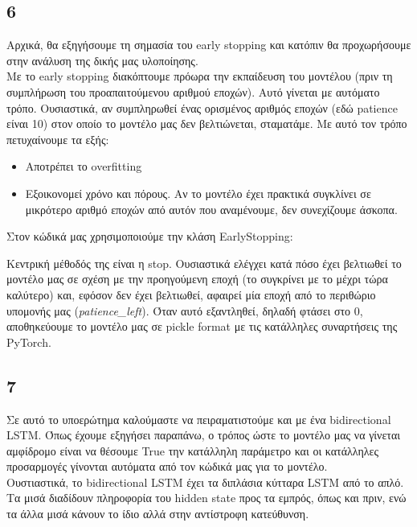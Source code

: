 \subsection*{6}
Αρχικά, θα εξηγήσουμε τη σημασία του early stopping και κατόπιν θα προχωρήσουμε στην ανάλυση της δικής μας υλοποίησης. \\

\noindent Με το early stopping διακόπτουμε πρόωρα την εκπαίδευση του μοντέλου (πριν τη συμπλήρωση του προαπαιτούμενου αριθμού εποχών). Αυτό γίνεται με αυτόματο τρόπο. Ουσιαστικά, αν συμπληρωθεί ένας ορισμένος αριθμός εποχών (εδώ patience είναι 10) στον οποίο το μοντέλο μας δεν βελτιώνεται, σταματάμε. Με αυτό τον τρόπο πετυχαίνουμε τα εξής:

\begin{itemize}
	\item Αποτρέπει το overfitting 
	
	\item  Εξοικονομεί χρόνο και πόρους. Αν το μοντέλο έχει πρακτικά συγκλίνει σε μικρότερο αριθμό εποχών από αυτόν που αναμένουμε, δεν συνεχίζουμε άσκοπα.
\end{itemize}

\noindent Στον κώδικά μας χρησιμοποιούμε την κλάση EarlyStopping:



\noindent Κεντρική μέθοδός της είναι η stop. Ουσιαστικά ελέγχει κατά πόσο έχει βελτιωθεί το μοντέλο μας σε σχέση με την προηγούμενη εποχή (το συγκρίνει με το μέχρι τώρα καλύτερο) και, εφόσον δεν έχει βελτιωθεί, αφαιρεί μία εποχή από το περιθώριο υπομονής μας (\textit{patience\_left}). Όταν αυτό εξαντληθεί, δηλαδή φτάσει στο 0, αποθηκεύουμε το μοντέλο μας σε pickle format με τις κατάλληλες συναρτήσεις της PyTorch.

\subsection*{7}
Σε αυτό το υποερώτημα καλούμαστε να πειραματιστούμε και με ένα bidirectional LSTM. Όπως έχουμε εξηγήσει παραπάνω, ο τρόπος ώστε το μοντέλο μας να γίνεται αμφίδρομο είναι να θέσουμε True την κατάλληλη παράμετρο και οι κατάλληλες προσαρμογές γίνονται αυτόματα από τον κώδικά μας για το μοντέλο.\\

\noindent Ουστιαστικά, το bidirectional LSTM έχει τα διπλάσια κύτταρα LSTM από το απλό. Τα μισά διαδίδουν πληροφορία του hidden state προς τα εμπρός, όπως και πριν, ενώ τα άλλα μισά κάνουν το ίδιο αλλά στην αντίστροφη κατεύθυνση. \\

